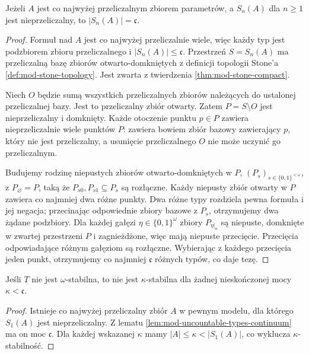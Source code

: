 \begin{lemat}
\label{lem:mod-uncountable-types-continuum}
Jeżeli $A$ jest co najwyżej przeliczalnym
zbiorem parametrów, a $S_n(A)$ dla $n\geq1$ jest
nieprzeliczalny, to $|S_n(A)|=\mathfrak c$.
\end{lemat}
\begin{proof}
Formuł nad $A$ jest co najwyżej przeliczalnie
wiele, więc każdy typ jest podzbiorem
zbioru przeliczalnego i $|S_n(A)|\leq\mathfrak c$.
Przestrzeń $S=S_n(A)$ ma przeliczalną
bazę zbiorów otwarto-domkniętych
z definicji topologii Stone'a
\ref{def:mod-stone-topology}.
Jest zwarta z twierdzenia
\ref{thm:mod-stone-compact}.

Niech $O$ będzie sumą wszystkich przeliczalnych
zbiorów należących do ustalonej przeliczalnej
bazy. Jest to przeliczalny zbiór otwarty.
Zatem $P=S\setminus O$ jest nieprzeliczalny
i domknięty. Każde otoczenie punktu $p\in P$
zawiera nieprzeliczalnie wiele punktów $P$:
zawiera bowiem zbiór bazowy zawierający $p$,
który nie jest przeliczalny, a usunięcie
przeliczalnego $O$ nie może uczynić
go przeliczalnym.

Budujemy rodzinę niepustych zbiorów
otwarto-domkniętych w $P$,
$(P_s)_{s\in\{0,1\}^{<\omega}}$,
z $P_{\varnothing}=P$,
taką że $P_{s0},P_{s1}\subseteq P_s$
są rozłączne. Każdy niepusty zbiór otwarty
w $P$ zawiera co najmniej dwa różne punkty.
Dwa różne typy rozdziela pewna formuła
i jej negacja; przecinając odpowiednie
zbiory bazowe z $P_s$, otrzymujemy
dwa żądane podzbiory.
Dla każdej gałęzi $\eta\in\{0,1\}^\omega$
zbiory $P_{\eta|_n}$ są niepuste, domknięte
w zwartej przestrzeni $P$ i zagnieżdżone,
więc mają niepuste przecięcie.
Przecięcia odpowiadające różnym gałęziom
są rozłączne.
Wybierając z każdego przecięcia jeden punkt,
otrzymujemy co najmniej $\mathfrak c$
różnych typów, co daje tezę.
\end{proof}

\begin{wniosek}
\label{cor:mod-nonomega-continuum}
Jeśli $T$ nie jest $\omega$-stabilna, to
nie jest $\kappa$-stabilna dla żadnej
nieskończonej mocy $\kappa<\mathfrak c$.
\end{wniosek}
\begin{proof}
Istnieje co najwyżej przeliczalny zbiór
$A$ w pewnym modelu, dla którego
$S_1(A)$ jest nieprzeliczalny.
Z lematu \ref{lem:mod-uncountable-types-continuum}
ma on moc $\mathfrak c$.
Dla każdej wskazanej $\kappa$ mamy
$|A|\leq\kappa<|S_1(A)|$, co wyklucza
$\kappa$-stabilność.
\end{proof}

